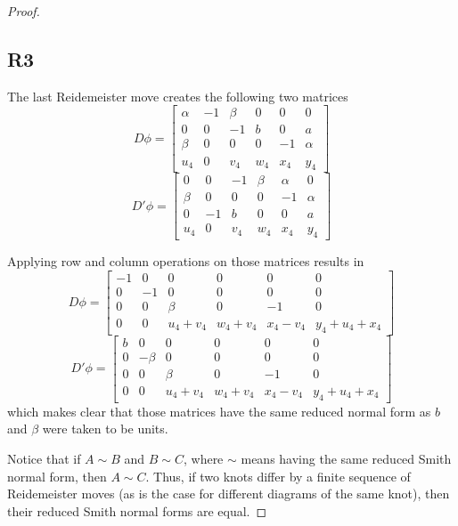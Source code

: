 \begin{proof}
  \subsection*{\centering R3}

  The last Reidemeister move creates the following two matrices
  $$D\phi=
  \begin{bmatrix}
    \alpha & -1 & \beta & 0 & 0 & 0 \\ 
    0 & 0 & -1 & b & 0 & a \\ 
    \beta & 0 & 0 & 0 & -1 & \alpha \\ 
    u_4 & 0 & v_4 & w_4 & x_4 & y_4
  \end{bmatrix}
  $$
  $$D'\phi=
  \begin{bmatrix}
    0 & 0 & -1 & \beta & \alpha & 0 \\ 
    \beta & 0 & 0 & 0 & -1 & \alpha \\ 
    0 & -1 & b & 0 & 0 & a\\ 
    u_4 & 0 & v_4 & w_4 & x_4 & y_4
  \end{bmatrix}
  $$

  Applying row and column operations on those matrices results in 
  $$
  D\phi=
  \begin{bmatrix}
    -1 & 0 & 0 & 0 & 0 & 0 \\
    0 & -1 & 0 & 0 & 0 & 0 \\ 
    0 & 0 & \beta & 0 & -1 & 0 \\ 
    0 & 0 & u_4+v_4 & w_4+v_4 & x_4-v_4 & y_4+u_4+x_4
  \end{bmatrix}
  $$
  $$
  D'\phi=
  \begin{bmatrix}
    b & 0 & 0 & 0 & 0 & 0 \\
    0 & -\beta & 0 & 0 & 0 & 0 \\ 
    0 & 0 & \beta & 0 & -1 & 0 \\ 
    0 & 0 & u_4+v_4 & w_4+v_4 & x_4-v_4 & y_4+u_4+x_4
  \end{bmatrix}
  $$
  which makes clear that those matrices have the same reduced normal form as $b$ and $\beta$ were taken to be units.

  Notice that if $A\sim B$ and $B\sim C$, where $\sim$ means having the same reduced Smith normal form, then $A\sim C$. Thus, if two knots differ by a finite sequence of Reidemeister moves (as is the case for different diagrams of the same knot), then their reduced Smith normal forms are equal.

\end{proof}
